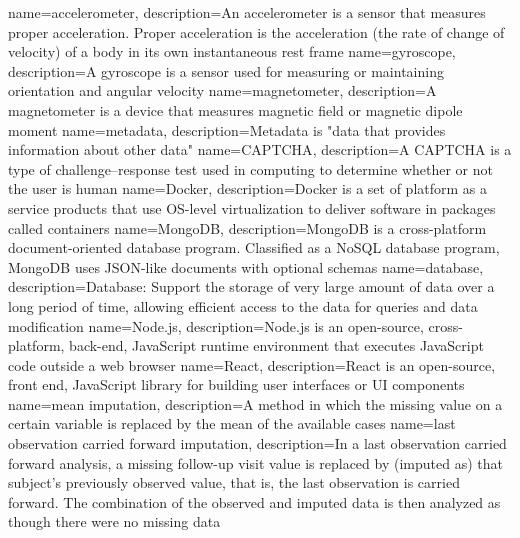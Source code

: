{
    name={accelerometer},
    description={An accelerometer is a sensor that measures proper acceleration. Proper acceleration is the acceleration (the rate of change of velocity) of a body in its own instantaneous rest frame
    }
}
{
    name={gyroscope},
    description={A gyroscope is a sensor used for measuring or maintaining orientation and angular velocity
    }
}
{
    name={magnetometer},
    description={A magnetometer is a device that measures magnetic field or magnetic dipole moment}
}
{
    name={metadata},
    description={Metadata is "data that provides information about other data"}
}
{
    name={CAPTCHA},
    description={A CAPTCHA is a type of challenge–response test used in computing to determine whether or not the user is human}
}
{
    name={Docker},
    description={Docker is a set of platform as a service products that use OS-level virtualization to deliver software in packages called containers}
}
{
    name={MongoDB},
    description={MongoDB is a cross-platform document-oriented database program. Classified as a NoSQL database program, MongoDB uses JSON-like documents with optional schemas}
}
{
    name={database},
    description={Database: Support the storage of very large amount of data over a long period of time, allowing efficient access to the data for queries and data modification}
}
{
    name={Node.js},
    description={Node.js is an open-source, cross-platform, back-end, JavaScript runtime environment that executes JavaScript code outside a web browser}
}
{
    name={React},
    description={React is an open-source, front end, JavaScript library for building user interfaces or UI components}
}
{
    name={mean imputation},
    description={A method in which the missing value on a certain variable is replaced by the mean of the available cases}
}
{
    name={last observation carried forward imputation},
    description={In a last observation carried forward analysis, a missing follow-up visit value is replaced by (imputed as) that subject's previously observed value, that is, the last observation is carried forward. The combination of the observed and imputed data is then analyzed as though there were no missing data}
}
